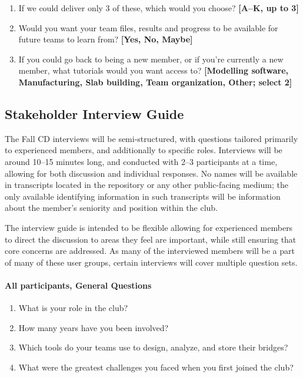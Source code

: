 \documentclass[12pt, titlepage]{article}
\begin{document}
\begin{enumerate}
\begin{enumerate}
    \item[K.] Club announcements and general information page
  \end{enumerate}
  \item If we could deliver only 3 of these, which would you choose?
    \textbf{[A--K, up to 3]}
  \item Would you want your team files, results and progress to be available for
    future teams to learn from? \textbf{[Yes, No, Maybe]}
  \item If you could go back to being a new member, or if you're currently a new
    member, what tutorials would you want access to? \textbf{[Modelling software,
    Manufacturing, Slab building, Team organization, Other; select 2]}
\end{enumerate}

\subsection{Stakeholder Interview Guide}
\label{app:interview-guide}

The Fall CD interviews will be semi-structured, with questions tailored primarily to experienced members, and additionally to specific roles. Interviews will 
be around 10--15 minutes long, and conducted with 2--3 participants at a time, allowing for both discussion and individual responses. 
No names will be available in transcripts located in the repository or any other public-facing medium;
the only available identifying information in such transcripts will be information about the member's
 seniority and position within the club.

The interview guide is intended to be flexible allowing for experienced members to direct 
the discussion to areas they feel are important, while still ensuring that core concerns are addressed.
 As many of the interviewed members will be a part of many of these user groups, certain interviews will cover 
multiple question sets.

\paragraph{All participants, General Questions}
\begin{enumerate}
  \item What is your role in the club? 
  \item How many years have you been involved?
  \item Which tools do your teams use to design, analyze, and store their bridges?
  \item What were the greatest challenges you faced when you first joined the club?
\end{enumerate}
\end{document}
